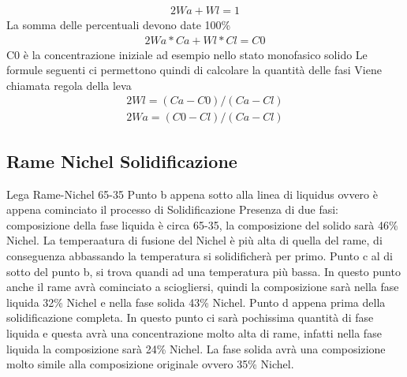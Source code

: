 \documentclass{article}%
\begin{document}
%
\newline%
%
\begin{alignat}{2}%
Wa + Wl = 1
%
\end{alignat}%
La somma delle percentuali devono date 100\%\newline%
%
\newline%
%
\begin{alignat}{2}%
Wa*Ca + Wl*Cl = C0
%
\end{alignat}%
C0 è la concentrazione iniziale ad esempio nello stato monofasico solido\newline%
%
\newline%
%
Le formule seguenti ci permettono quindi di calcolare la quantità delle fasi\newline%
%
Viene chiamata regola della leva\newline%
%
\newline%
%
\begin{alignat}{2}%
Wl = (Ca - C0) / (Ca - Cl)
%
\end{alignat}%
\begin{alignat}{2}%
Wa = (C0 - Cl) / (Ca - Cl)
%
\end{alignat}%
\newline%

%
\subsection{ Rame Nichel Solidificazione }%
\label{subsec:RameNichelSolidificazione}%
Lega Rame{-}Nichel 65{-}35\newline%
%
\newline%
%
Punto b appena sotto alla linea di liquidus ovvero è appena cominciato il processo di Solidificazione\newline%
%
Presenza di due fasi: composizione della fase liquida è circa 65{-}35, la composizione del solido sarà 46\% Nichel.\newline%
%
La temperaatura di fusione del Nichel è più alta di quella del rame, di conseguenza abbassando la temperatura si solidificherà per primo.\newline%
%
\newline%
%
Punto c al di sotto del punto b, si trova quandi ad una temperatura più bassa.\newline%
%
In questo punto anche il rame avrà cominciato a sciogliersi, quindi la composizione sarà nella fase liquida 32\% Nichel e nella fase solida 43\% Nichel.\newline%
%
\newline%
%
Punto d appena prima della solidificazione completa.\newline%
%
In questo punto ci sarà pochissima quantità di fase liquida e questa avrà una concentrazione molto alta di rame,\newline%
%
infatti nella fase liquida la composizione sarà 24\% Nichel.\newline%
%
La fase solida avrà una composizione molto simile alla composizione originale ovvero 35\% Nichel.\newline%
%
\newline%
\end{document}
